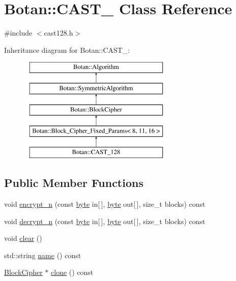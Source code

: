 \hypertarget{classBotan_1_1CAST__128}{\section{Botan\-:\-:C\-A\-S\-T\-\_ Class Reference}
\label{classBotan_1_1CAST__128}
}


{\ttfamily \#include $<$cast128.\-h$>$}

Inheritance diagram for Botan\-:\-:C\-A\-S\-T\-\_\-:\begin{figure}[H]
\begin{center}
\leavevmode
\includegraphics[height=5.000000cm]{classBotan_1_1CAST__128}
\end{center}
\end{figure}
\subsection*{Public Member Functions}
\begin{DoxyCompactItemize}
\item 
void \hyperlink{classBotan_1_1CAST__128_ab3f75f0140c705e7ad1963488de68ac0}{encrypt\-\_\-n} (const \hyperlink{namespaceBotan_a7d793989d801281df48c6b19616b8b84}{byte} in\mbox{[}$\,$\mbox{]}, \hyperlink{namespaceBotan_a7d793989d801281df48c6b19616b8b84}{byte} out\mbox{[}$\,$\mbox{]}, size\-\_\-t blocks) const 
\item 
void \hyperlink{classBotan_1_1CAST__128_ae4d49d88316d80e66e3a8b3a4b5b4070}{decrypt\-\_\-n} (const \hyperlink{namespaceBotan_a7d793989d801281df48c6b19616b8b84}{byte} in\mbox{[}$\,$\mbox{]}, \hyperlink{namespaceBotan_a7d793989d801281df48c6b19616b8b84}{byte} out\mbox{[}$\,$\mbox{]}, size\-\_\-t blocks) const 
\item 
void \hyperlink{classBotan_1_1CAST__128_ac98b4f015c7660b47b922e44945b3937}{clear} ()
\item 
std\-::string \hyperlink{classBotan_1_1CAST__128_a50cc45d222a0ab459b54ea92026ac933}{name} () const 
\item 
\hyperlink{classBotan_1_1BlockCipher}{Block\-Cipher} $\ast$ \hyperlink{classBotan_1_1CAST__128_a09b30fda4426703c60d929883b008fe2}{clone} () const 
\end{DoxyCompactItemize}
